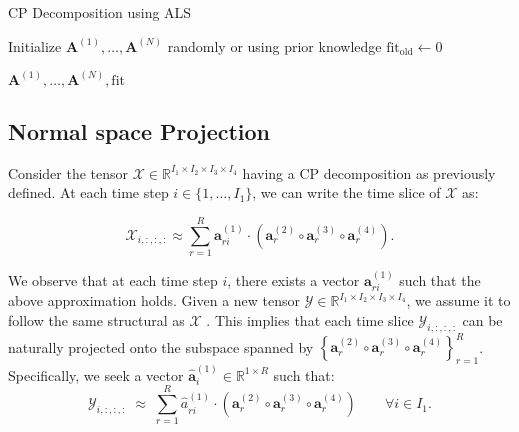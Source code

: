 \documentclass[preprint,12pt,authoryear]{elsarticle}
\begin{document}
\begin{algorithm}[H]
\caption{CP Decomposition using ALS }

Initialize $\mathbf{A}^{(1)}, \ldots, \mathbf{A}^{(N)}$ randomly or using prior knowledge\;
$\text{fit}_{\text{old}} \gets 0$\;

\Return $\mathbf{A}^{(1)}, \ldots, \mathbf{A}^{(N)}, \text{fit}$\;
\end{algorithm}



\subsection{Normal space Projection}
Consider the tensor \(\mathcal{X} \in \mathbb{R}^{I_1 \times I_2 \times I_3 \times I_4}\) having a CP decomposition as previously defined. At each time step \(i \in \{1, \dots, I_1\}\), we can write the time slice of \(\mathcal{X}\) as:

\begin{equation}
\mathcal{X}_{i,:,:,:} \approx \sum_{r=1}^{R} \mathbf{a}_{ri}^{(1)} \cdot \left( \mathbf{a}_r^{(2)} \circ \mathbf{a}_r^{(3)} \circ \mathbf{a}_r^{(4)} \right).
\end{equation}

\noindent We observe that at each time step \(i\), there exists a vector \(\mathbf{a}_{ri}^{(1)}\) such that the above approximation holds. Given a new tensor \(\mathcal{Y} \in \mathbb{R}^{I_1 \times I_2 \times I_3 \times I_4}\), we assume it to follow the same structural as \(\mathcal{X}\)  . This implies that each time slice \(\mathcal{Y}_{i,:,:,:}\) can be naturally projected onto the subspace spanned by \(\left\{\mathbf{a}_r^{(2)} \circ \mathbf{a}_r^{(3)} \circ \mathbf{a}_r^{(4)}  \right\}_{r=1}^{R}
\). Specifically, we seek a vector \(\hat{\mathbf{a}}_{i}^{(1)} \in \mathbb{R}^{1 \times R}\) such that:
\begin{equation}
\mathcal{Y}_{i,:,:,:} \;\approx\; 
\sum_{r=1}^{R} \hat{a}^{(1)}_{ri} \cdot 
\left( \mathbf{a}_r^{(2)} \circ \mathbf{a}_r^{(3)} \circ \mathbf{a}_r^{(4)} \right)
\qquad \forall i \in I_1.
\end{equation}
\end{document}
